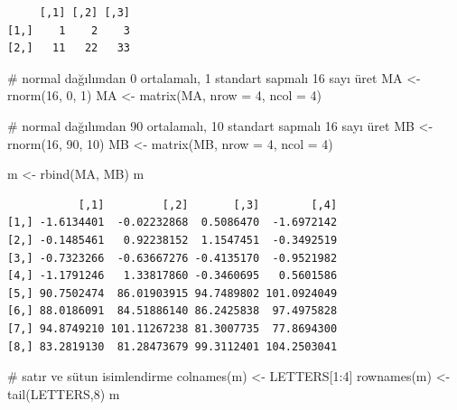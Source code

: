 \documentclass[
  letterpaper,
  DIV=11,
  numbers=noendperiod]{scrreprt}
\newenvironment{Shaded}{\begin{snugshade}}{\end{snugshade}}
\newcommand{\AttributeTok}[1]{\textcolor[rgb]{0.40,0.45,0.13}{#1}}
\newcommand{\CommentTok}[1]{\textcolor[rgb]{0.37,0.37,0.37}{#1}}
\newcommand{\DecValTok}[1]{\textcolor[rgb]{0.68,0.00,0.00}{#1}}
\newcommand{\FunctionTok}[1]{\textcolor[rgb]{0.28,0.35,0.67}{#1}}
\newcommand{\NormalTok}[1]{\textcolor[rgb]{0.00,0.23,0.31}{#1}}
\newcommand{\OtherTok}[1]{\textcolor[rgb]{0.00,0.23,0.31}{#1}}
\newcommand{\SpecialCharTok}[1]{\textcolor[rgb]{0.37,0.37,0.37}{#1}}
\begin{document}
\begin{verbatim}
     [,1] [,2] [,3]
[1,]    1    2    3
[2,]   11   22   33
\end{verbatim}

\begin{Shaded}
\begin{Highlighting}[]
\CommentTok{\# normal dağılımdan 0 ortalamalı, 1 standart sapmalı 16 sayı üret}
\NormalTok{MA }\OtherTok{\textless{}{-}} \FunctionTok{rnorm}\NormalTok{(}\DecValTok{16}\NormalTok{, }\DecValTok{0}\NormalTok{, }\DecValTok{1}\NormalTok{)}
\NormalTok{MA }\OtherTok{\textless{}{-}} \FunctionTok{matrix}\NormalTok{(MA, }\AttributeTok{nrow =} \DecValTok{4}\NormalTok{, }\AttributeTok{ncol =} \DecValTok{4}\NormalTok{)}

\CommentTok{\# normal dağılımdan 90 ortalamalı, 10 standart sapmalı 16 sayı üret}
\NormalTok{MB }\OtherTok{\textless{}{-}} \FunctionTok{rnorm}\NormalTok{(}\DecValTok{16}\NormalTok{, }\DecValTok{90}\NormalTok{, }\DecValTok{10}\NormalTok{)}
\NormalTok{MB }\OtherTok{\textless{}{-}} \FunctionTok{matrix}\NormalTok{(MB, }\AttributeTok{nrow =} \DecValTok{4}\NormalTok{, }\AttributeTok{ncol =} \DecValTok{4}\NormalTok{)}

\NormalTok{m }\OtherTok{\textless{}{-}} \FunctionTok{rbind}\NormalTok{(MA, MB)}
\NormalTok{m}
\end{Highlighting}
\end{Shaded}

\begin{verbatim}
           [,1]         [,2]       [,3]        [,4]
[1,] -1.6134401  -0.02232868  0.5086470  -1.6972142
[2,] -0.1485461   0.92238152  1.1547451  -0.3492519
[3,] -0.7323266  -0.63667276 -0.4135170  -0.9521982
[4,] -1.1791246   1.33817860 -0.3460695   0.5601586
[5,] 90.7502474  86.01903915 94.7489802 101.0924049
[6,] 88.0186091  84.51886140 86.2425838  97.4975828
[7,] 94.8749210 101.11267238 81.3007735  77.8694300
[8,] 83.2819130  81.28473679 99.3112401 104.2503041
\end{verbatim}

\begin{Shaded}
\begin{Highlighting}[]
\CommentTok{\# satır ve sütun isimlendirme}
\FunctionTok{colnames}\NormalTok{(m) }\OtherTok{\textless{}{-}}\NormalTok{ LETTERS[}\DecValTok{1}\SpecialCharTok{:}\DecValTok{4}\NormalTok{]}
\FunctionTok{rownames}\NormalTok{(m) }\OtherTok{\textless{}{-}} \FunctionTok{tail}\NormalTok{(LETTERS,}\DecValTok{8}\NormalTok{)}
\NormalTok{m}
\end{Highlighting}
\end{Shaded}
\end{document}
